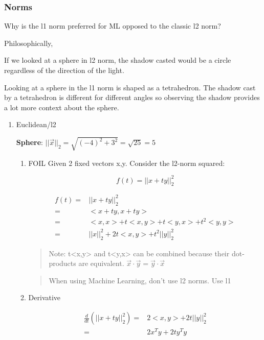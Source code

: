 \documentclass[11pt]{article}
\begin{document}
\subsubsection{Norms}
\label{sec:org326028b}

Why is the l1 norm preferred for ML opposed to the classic l2 norm?

Philosophically,

If we looked at a sphere in l2 norm, the shadow casted would be a circle
regardless of the direction of the light.

Looking at a sphere in the l1 norm is shaped as a tetrahedron. The shadow cast
by a tetrahedron is different for different angles so observing the shadow
provides a lot more context about the sphere.

\begin{enumerate}
\item Euclidean/l2
\label{sec:orga249345}

\textbf{Sphere}: \(||\vec{x}||_2 = \sqrt{(-4)^2 + 3^2} = \sqrt{25} = 5\)

\begin{enumerate}
\item FOIL
\label{sec:org4fb89ae}
Given 2 fixed vectors x,y. Consider the l2-norm squared:

$$
f(t) = ||x + ty||_2^2
$$


\begin{equation}
\begin{split}
f(t) = & ||x + ty||_2^2\\
= & <x + ty, x+ ty>\\
= & <x,x> + t <x, y> + t <y, x> + t^2 <y, y>\\
= & ||x||_2^2 + 2t<x,y> + t^2 ||y||_2^2
\end{split}
\end{equation}

\begin{quote}
Note: t<x,y> and t<y,x> can be combined because their dot-products are
equivalent. \(\vec{x} \cdot \vec{y} = \vec{y} \cdot \vec{x}\)
\end{quote}

\begin{quote}
When using Machine Learning, don't use l2 norms. Use l1
\end{quote}

\item Derivative
\label{sec:orgb665491}

\begin{equation}
\begin{split}
\frac{d}{dt}(||x + ty||_2^2) = & 2<x, y> + 2t ||y||_2^2\\
= & 2 x^T y + 2t y^T y
\end{split}
\end{equation}
\end{enumerate}


\end{enumerate}
\end{document}
